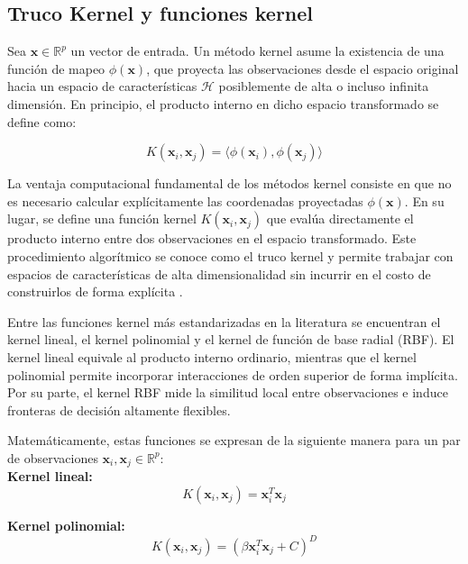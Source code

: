 \subsection{Truco Kernel y funciones kernel}

Sea $\mathbf{x} \in \mathbb{R}^p$ un vector de entrada. Un método kernel asume la existencia de una función de mapeo $\phi(\mathbf{x})$, que proyecta las observaciones desde el espacio original hacia un espacio de características $\mathcal{H}$ posiblemente de alta o incluso infinita dimensión. En principio, el producto interno en dicho espacio transformado se define como:

\begin{equation}
	K(\mathbf{x}_i, \mathbf{x}_j) = \langle \phi(\mathbf{x}_i), \phi(\mathbf{x}_j) \rangle
	\label{eq:EMT15}
\end{equation}


La ventaja computacional fundamental de los métodos kernel consiste en que no es necesario calcular explícitamente las coordenadas proyectadas $\phi(\mathbf{x})$. En su lugar, se define una función kernel $K(\mathbf{x}_i,\mathbf{x}_j)$ que evalúa directamente el producto interno entre dos observaciones en el espacio transformado. Este procedimiento algorítmico se conoce como el truco kernel y permite trabajar con espacios de características de alta dimensionalidad sin incurrir en el costo de construirlos de forma explícita \cite{bishop2006pattern}.

Entre las funciones kernel más estandarizadas en la literatura se encuentran el kernel lineal, el kernel polinomial y el kernel de función de base radial (RBF). El kernel lineal equivale al producto interno ordinario, mientras que el kernel polinomial permite incorporar interacciones de orden superior de forma implícita. Por su parte, el kernel RBF mide la similitud local entre observaciones e induce fronteras de decisión altamente flexibles.

Matemáticamente, estas funciones se expresan de la siguiente manera para un par de observaciones $\mathbf{x}_i, \mathbf{x}_j \in \mathbb{R}^p$: \\


\noindent\textbf{Kernel lineal:}
\begin{equation}
	K(\mathbf{x}_i, \mathbf{x}_j) = \mathbf{x}_i^T \mathbf{x}_j
	\label{eq:EMT16}
\end{equation}


\noindent\textbf{Kernel polinomial:}
\begin{equation}
	K(\mathbf{x}_i, \mathbf{x}_j) = (\beta \mathbf{x}_i^T \mathbf{x}_j + C)^D
	\label{eq:EMT17}
\end{equation}


